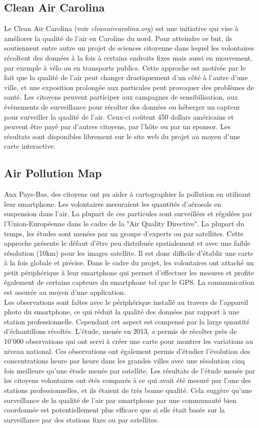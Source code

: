 \documentclass[10pt, article]{llncs}
\begin{document}
	\subsection{Clean Air Carolina}
		Le Clean Air Carolina (voir \textit{cleanaircarolina.org}) est une initiative qui vise à améliorer la qualité de l'air en Caroline du nord. Pour atteindre ce but, ils soutiennent entre autre un projet de sciences citoyenne dans lequel les volontaires récoltent des données à la fois à certains endroits fixes mais aussi en mouvement, par exemple à vélo ou en transports publics. Cette approche est motivée par le fait que la qualité de l'air peut changer drastiquement d'un côté à l'autre d'une ville, et une exposition prolongée aux particules peut provoquer des problèmes de santé. Les citoyens peuvent participer aux campagnes de sensibilisation, aux évènements de surveillance pour récolter des données ou héberger un capteur pour surveiller la qualité de l'air. Ceux-ci coûtent 450 dollars américains et peuvent être payé par d'autres citoyens, par l'hôte ou par un sponsor. Les résultats sont disponibles librement sur le site web du projet au moyen d'une carte interactive.
		
	\subsection{Air Pollution Map}
		Aux Pays-Bas, des citoyens ont pu aider à cartographier la pollution en utilisant leur smartphone. Les volontaires mesuraient les quantités d'aérosols en suspension dans l'air. La plupart de ces particules sont surveillées et régulées par l'Union-Européenne dans le cadre de la "Air Quality Directive". La plupart du temps, les études sont menées par un groupe d'experts ou par satellites. Cette approche présente le défaut d'être peu distribuée spatialement et avec une faible résolution (10km) pour les images satellite. Il est donc difficile d'établir une carte à la fois globale et précise. Dans le cadre du projet, les volontaires ont attaché un petit périphérique à leur smartphone qui permet d'effectuer les mesures et profite également de certains capteurs du smartphone tel que le GPS. La communication est assurée au moyen d'une application.\\
		Les observations sont faîtes avec le périphérique installé au travers de l'appareil photo du smartphone, ce qui réduit la qualité des données par rapport à une station professionnelle. Cependant cet aspect est compensé par la large quantité d'échantillons récoltés. L'étude, menée en 2013, a permis de récolter près de 10'000 observations qui ont servi à créer une carte pour montrer les variations au niveau national. Ces observations ont également permis d'étudier l'évolution des concentrations heure par heure dans les grandes villes avec une résolution cinq fois meilleure qu'une étude menée par satellite. Les résultats de l'étude menée par les citoyens volontaires ont étés comparés à ce qui avait été mesuré par l'une des stations professionnelles, et ils étaient de très bonne qualité. Cela suggère qu'une surveillance de la qualité de l'air par smartphone par une communauté bien coordonnée est potentiellement plus efficace que si elle était basée sur la surveillance par des stations fixes ou par satellites.
		
\end{document}
